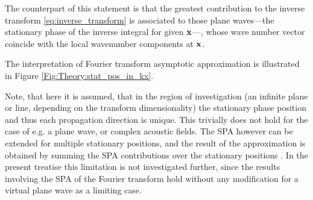 The counterpart of this statement is that the greatest contribution to the inverse transform \eqref{eq:inverse_transform} is associated to those plane waves---the stationary phase of the inverse integral for given $\mathbf{x}$---, whose wave number vector coincide with the local wavenumber components at $\mathbf{x}$.

The interpretation of Fourier transform asymptotic approximation is illustrated in Figure \ref{Fig:Theory:stat_pos_in_kx}.

Note, that here it is assumed, that in the region of investigation (an infinite plane or line, depending on the transform dimensionality) the stationary phase position and thus each propagation direction is unique.
This trivially does not hold for the case of e.g. a plane wave, or complex acoustic fields.
The SPA however can be extended for multiple stationary positions, and the result of the approximation is obtained by summing the SPA contributions over the stationary positions \cite[p. 129]{Bleistein2000}.
In the present treatise this limitation is not investigated further, since the results involving the SPA of the Fourier transform hold without any modification for a virtual plane wave as a limiting case.


